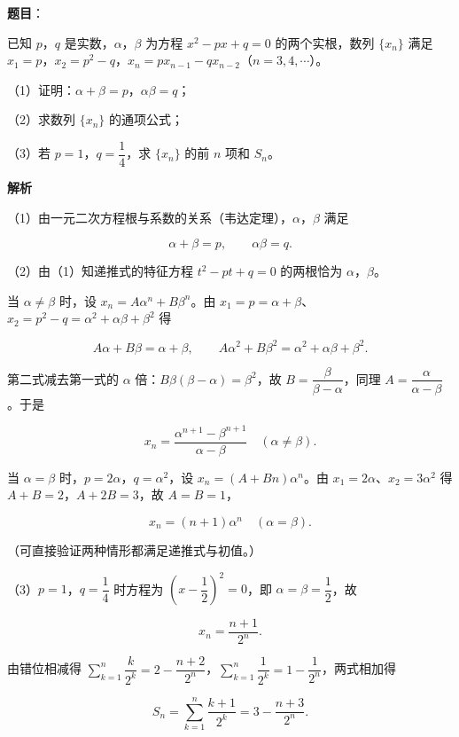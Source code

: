 \begin{answer}

\textbf{题目}：

已知 $p$，$q$ 是实数，$\alpha$，$\beta$ 为方程 $x^2-px+q=0$ 的两个实根，数列 $\{x_n\}$ 满足 $x_1=p$，$x_2=p^2-q$，$x_n=px_{n-1}-qx_{n-2}$（$n=3,4,\cdots$）。

（1）证明：$\alpha+\beta=p$，$\alpha\beta=q$；

（2）求数列 $\{x_n\}$ 的通项公式；

（3）若 $p=1$，$q=\dfrac14$，求 $\{x_n\}$ 的前 $n$ 项和 $S_n$。

\textbf{解析}

（1）由一元二次方程根与系数的关系（韦达定理），$\alpha$，$\beta$ 满足

\nopagebreak[4]
\[\alpha+\beta=p,\qquad \alpha\beta=q.\]

（2）由（1）知递推式的特征方程 $t^2-pt+q=0$ 的两根恰为 $\alpha$，$\beta$。

当 $\alpha\ne\beta$ 时，设 $x_n=A\alpha^n+B\beta^n$。由 $x_1=p=\alpha+\beta$、$x_2=p^2-q=\alpha^2+\alpha\beta+\beta^2$ 得

\nopagebreak[4]
\[A\alpha+B\beta=\alpha+\beta,\qquad A\alpha^2+B\beta^2=\alpha^2+\alpha\beta+\beta^2.\]

第二式减去第一式的 $\alpha$ 倍：$B\beta(\beta-\alpha)=\beta^2$，故 $B=\dfrac{\beta}{\beta-\alpha}$，同理 $A=\dfrac{\alpha}{\alpha-\beta}$。于是

\nopagebreak[4]
\[x_n=\frac{\alpha^{n+1}-\beta^{n+1}}{\alpha-\beta}\quad(\alpha\ne\beta).\]

当 $\alpha=\beta$ 时，$p=2\alpha$，$q=\alpha^2$，设 $x_n=(A+Bn)\alpha^n$。由 $x_1=2\alpha$、$x_2=3\alpha^2$ 得 $A+B=2$，$A+2B=3$，故 $A=B=1$，

\nopagebreak[4]
\[x_n=(n+1)\alpha^n\quad(\alpha=\beta).\]

（可直接验证两种情形都满足递推式与初值。）

（3）$p=1$，$q=\dfrac14$ 时方程为 $\left(x-\dfrac12\right)^2=0$，即 $\alpha=\beta=\dfrac12$，故

\nopagebreak[4]
\[x_n=\frac{n+1}{2^n}.\]

由错位相减得 $\sum\limits_{k=1}^n\dfrac k{2^k}=2-\dfrac{n+2}{2^n}$，$\sum\limits_{k=1}^n\dfrac1{2^k}=1-\dfrac1{2^n}$，两式相加得

\nopagebreak[4]
\[S_n=\sum_{k=1}^n\frac{k+1}{2^k}=3-\frac{n+3}{2^n}.\]


\end{answer}